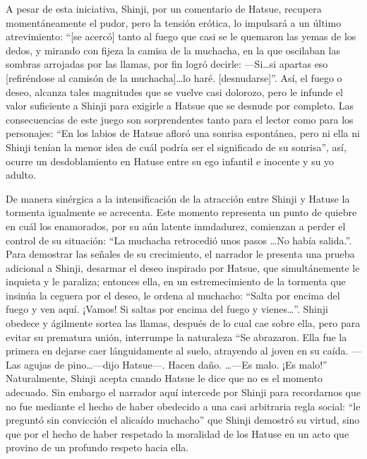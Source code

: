 A pesar de esta iniciativa, Shinji, por un comentario de Hatsue, recupera momentáneamente el pudor, pero la tensión erótica, lo impulsará a un último atrevimiento: ``[se acercó] tanto al fuego que casi se le quemaron las yemas de los dedos, y mirando con fijeza la camisa de la muchacha, en la que oscilaban las sombras arrojadas por las llamas, por fin logró decirle:
—Si\ldots si apartas eso [refiréndose al camisón de la muchacha]\ldots lo haré. [desnudarse]''\autocite{mishima2006}. Así, el fuego o deseo, alcanza tales magnitudes que se vuelve casi dolorozo, pero le infunde el valor suficiente a Shinji para exigirle a Hatsue que se desnude por completo.
Las consecuencias de este juego son sorprendentes tanto para el lector como para los personajes: ``En los labios de Hatsue afloró una sonrisa espontánea, pero ni ella ni Shinji tenían la menor idea de cuál podría ser el significado de su sonrisa''\autocite{mishima2006}, así, ocurre un desdoblamiento en Hatuse entre su ego infantil e inocente y su yo adulto. 

De manera sinérgica a la intensificación de la atracción entre Shinji y Hatuse la tormenta igualmente se acrecenta. Este momento representa un punto de quiebre en cuál los enamorados, por su aún latente inmdadurez, comienzan a perder el control de su situación: ``La muchacha retrocedió unos pasos \ldots No había salida.''\autocite{mishima2006}. Para demostrar las señales de su crecimiento, el narrador le presenta una prueba adicional a Shinji, desarmar el deseo inspirado por Hatsue, que simultánemente le inquieta y le paraliza; entonces ella, en un estremecimiento de la tormenta que insinúa la ceguera por el deseo, le ordena al muchacho: ``Salta por encima del fuego y ven aquí. ¡Vamos! Si saltas por encima del fuego y vienes\ldots''\autocite{mishima2006}. Shinji obedece y ágilmente sortea las llamas, después de lo cual cae sobre ella, pero para evitar su prematura unión, interrumpe la naturaleza ``Se abrazaron. Ella fue la primera en dejarse caer lánguidamente al suelo, atrayendo al joven en su caída. —Las agujas de pino\ldots —dijo Hatsue—. Hacen daño. \ldots —Es malo. ¡Es malo!''\autocite{mishima2006} Naturalmente, Shinji acepta cuando Hatsue le dice que no es el momento adecuado. Sin embargo el narrador aquí intercede por Shinji para recordarnos que no fue mediante el hecho de haber obedecido a una casi arbitraria regla social: ``le preguntó sin convicción el alicaído muchacho''\autocite{mishima2006} que Shinji demostró su virtud, sino que por  el hecho de haber respetado la moralidad de los Hatuse en un acto que provino de un profundo respeto hacia ella. 

